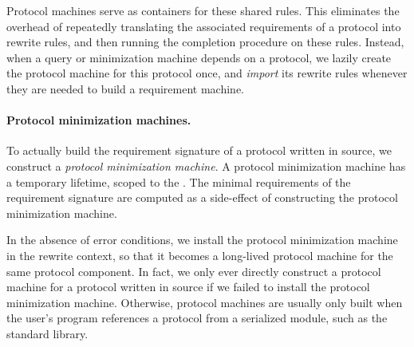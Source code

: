\documentclass[../generics]{subfiles}
\begin{document}
Protocol machines serve as containers for these shared rules. This eliminates the overhead of repeatedly translating the associated requirements of a protocol into rewrite rules, and then running the completion procedure on these rules. Instead, when a query or minimization machine depends on a protocol, we lazily create the protocol machine for this protocol once, and \emph{import} its rewrite rules whenever they are needed to build a requirement machine.

\paragraph{Protocol minimization machines.}
To actually build the requirement signature of a protocol written in source, we construct a \emph{protocol minimization machine}. A protocol minimization machine has a temporary lifetime, scoped to the . The minimal requirements of the requirement signature are computed as a side-effect of constructing the protocol minimization machine.

In the absence of error conditions, we install the protocol minimization machine in the rewrite context, so that it becomes a long-lived protocol machine for the same protocol component. In fact, we only ever directly construct a protocol machine for a protocol written in source if we failed to install the protocol minimization machine. Otherwise, protocol machines are usually only built when the user's program references a protocol from a serialized module, such as the standard library.
\end{document}

